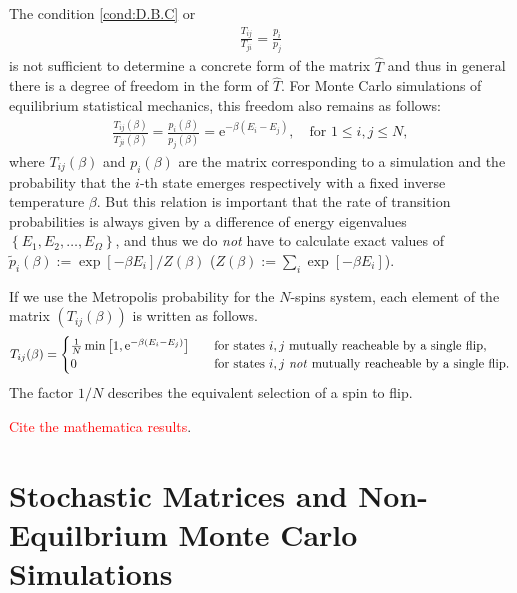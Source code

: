 The condition \eqref{cond:D.B.C} or
\begin{align}
\frac{T_{ij}}{T_{ji}} = \frac{p_{i}}{p_{j}}
\end{align}
is not sufficient to determine a concrete form of the matrix $\hat{T}$ and thus in general there is a degree of freedom in the form of $\hat{T}$. For Monte Carlo simulations of equilibrium statistical mechanics, this freedom also remains as follows:
\begin{align}
\frac{T_{ij}(\beta)}{T_{ji}(\beta)} = \frac{p_{i}(\beta)}{p_{j}(\beta)} = \mathrm{e}^{-\beta (E_{i}-E_{j})},\quad\text{for $1\leq i,j\leq N$},
\end{align}
where ${T_{ij}(\beta)}$ and $p_{i}(\beta)$ are the matrix corresponding to a simulation and the probability that the $i$-th state emerges respectively with a fixed inverse temperature $\beta$. But this relation is important that the rate of transition probabilities is always given by a difference of energy eigenvalues $\left\{E_{1},E_{2},\dots,E_{\Omega}\right\}$, and thus we do \textit{not} have to calculate exact values of $\tilde{p}_{i}(\beta):=\exp\left[-\beta E_{i}\right]/Z(\beta)$ ($Z(\beta):=\sum_{i}\exp\left[-\beta E_{i}\right]$).

If we use the Metropolis probability for the $N$-spins system, each element of the matrix $\left(T_{ij}(\beta)\right)$ is written as follows.
\begin{align}
T_{ij}(\beta)=
\begin{cases}
\frac{1}{N}\min\left[1,\mathrm{e}^{-\beta (E_{i}-E_{j})}\right]\quad&\text{for states $i,j$ mutually reacheable by a single flip},\\
0\quad&\text{for states $i,j$ \textit{not} mutually reacheable by a single flip}.
\end{cases}
\end{align}
The factor $1/N$ describes the equivalent selection of a spin to flip.

\textcolor{red}{Cite the mathematica results}.

\section{Stochastic Matrices and Non-Equilbrium Monte Carlo Simulations}
